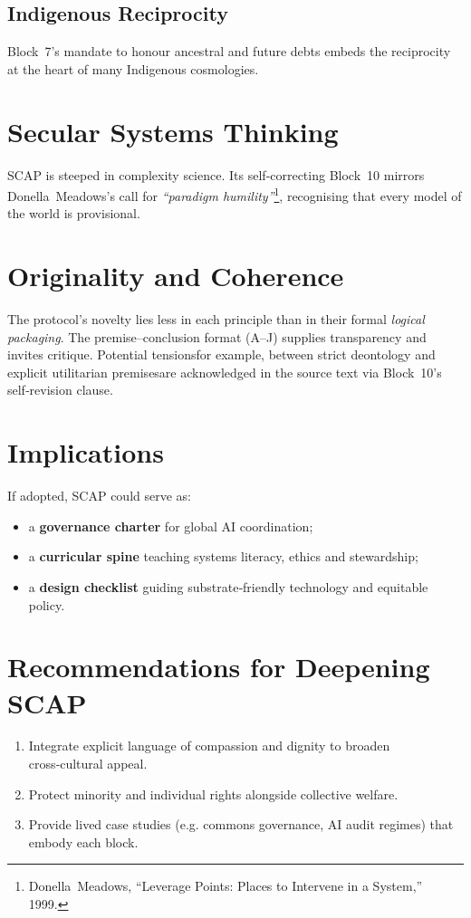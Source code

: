 \subsection*{Indigenous Reciprocity}
Block 7’s mandate to honour ancestral and future debts embeds the reciprocity at the heart of many Indigenous cosmologies.

\section{Secular Systems Thinking}
SCAP is steeped in complexity science.  Its self‑correcting Block 10 mirrors Donella Meadows’s call for \emph{``paradigm humility''}\footnote{Donella Meadows, “Leverage Points: Places to Intervene in a System,” 1999.}, recognising that every model of the world is provisional.

\section{Originality and Coherence}
The protocol’s novelty lies less in each principle than in their formal \emph{logical packaging}.  The premise–conclusion format (A–J) supplies transparency and invites critique.  Potential tensions\textemdash for example, between strict deontology and explicit utilitarian premises\textemdash are acknowledged in the source text via Block 10’s self‑revision clause.

\section{Implications}
If adopted, SCAP could serve as:
\begin{itemize}
  \item a \textbf{governance charter} for global AI coordination;
  \item a \textbf{curricular spine} teaching systems literacy, ethics and stewardship;
  \item a \textbf{design checklist} guiding substrate‑friendly technology and equitable policy.
\end{itemize}

\section{Recommendations for Deepening SCAP}
\begin{enumerate}
  \item Integrate explicit language of compassion and dignity to broaden cross‑cultural appeal.
  \item Protect minority and individual rights alongside collective welfare.
  \item Provide lived case studies (e.g. commons governance, AI audit regimes) that embody each block.
\end{enumerate}

